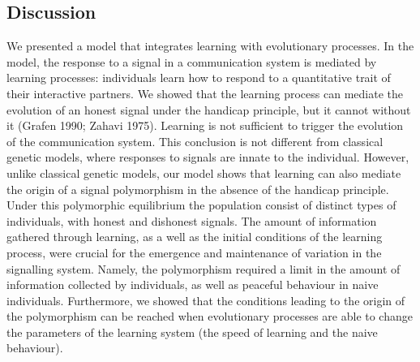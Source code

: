 \documentclass[
  12pt,
]{article}
\begin{document}
\hypertarget{discussion}{%
\subsection{Discussion}\label{discussion}}

We presented a model that integrates learning with evolutionary
processes. In the model, the response to a signal in a communication
system is mediated by learning processes: individuals learn how to
respond to a quantitative trait of their interactive partners. We showed
that the learning process can mediate the evolution of an honest signal
under the handicap principle, but it cannot without it (Grafen 1990;
Zahavi 1975). Learning is not sufficient to trigger the evolution of the
communication system. This conclusion is not different from classical
genetic models, where responses to signals are innate to the individual.
However, unlike classical genetic models, our model shows that learning
can also mediate the origin of a signal polymorphism in the absence of
the handicap principle. Under this polymorphic equilibrium the
population consist of distinct types of individuals, with honest and
dishonest signals. The amount of information gathered through learning,
as a well as the initial conditions of the learning process, were
crucial for the emergence and maintenance of variation in the signalling
system. Namely, the polymorphism required a limit in the amount of
information collected by individuals, as well as peaceful behaviour in
naive individuals. Furthermore, we showed that the conditions leading to
the origin of the polymorphism can be reached when evolutionary
processes are able to change the parameters of the learning system (the
speed of learning and the naive behaviour).
\end{document}
